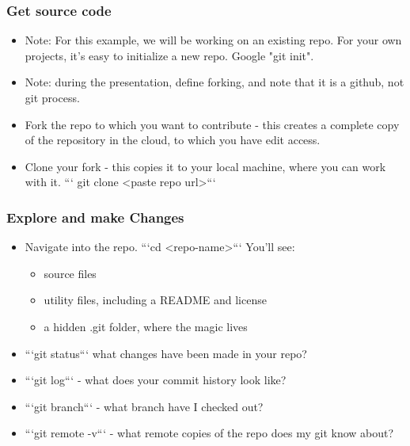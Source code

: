 \documentclass[unknownkeysallowed]{beamer}
\begin{document}
\begin{frame}
    \frametitle{Get source code}
    \begin{itemize}
        \item{Note: For this example, we will be working on an existing repo. For your own projects, it's easy to initialize a new repo. Google "git init".}
        \item{Note: during the presentation, define forking, and note that it is a github, not git process.}
        \item{Fork the repo to which you want to contribute - this creates a complete copy of the repository in the cloud, to which you have edit access.}
        \item{Clone your fork - this copies it to your local machine, where you can work with it.  ``` git clone <paste repo url>```}
    \end{itemize}
    \vspace{1cm} %
\end{frame}

\begin{frame}
    \frametitle{Explore and make Changes}
    \begin{itemize}
        \item{Navigate into the repo. ```cd <repo-name>``` You'll see:}
            \begin{itemize}
              \item{source files}
              \item{utility files, including a README and license}
              \item{a hidden .git folder, where the magic lives}
            \end{itemize}
        \item{```git status``` what changes have been made in your repo?}
        \item{```git log``` - what does your commit history look like?}
        \item{```git branch``` - what branch have I checked out?}
        \item{```git remote -v``` - what remote copies of the repo does my git know about?}
    \end{itemize}
    \vspace{1cm} %
\end{frame}
\end{document}
